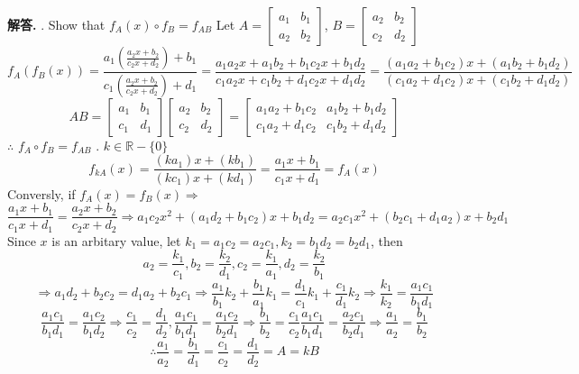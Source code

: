 \documentclass[12pt, a4paper, oneside]{article}
\newenvironment{solution}{\par\noindent\textbf{解答. }}{\par}
\begin{document}
\begin{CJK}{UTF8}{gbsn}
\begin{solution} . Show that $f_A(x) \circ f_B = f_{AB} $ \newline
  Let $A=\begin{bmatrix} a_1 & b_1 \\ a_2 & b_2 \end{bmatrix}$, $B=\begin{bmatrix}
    a_2 & b_2 \\ c_2 & d_2
  \end{bmatrix}$
  $$f_A(f_B(x)) = \frac{a_1\left(\frac{a_2x+b_2}{c_2x+d_2}\right)+b_1}{c_1\left(\frac{a_2x+b_2}{c_2x+d_2}\right)+d_1} = \frac{a_1a_2x+a_1b_2+b_1c_2x+b_1d_2}{c_1a_2x+c_1b_2+d_1c_2x+d_1d_2} =\frac{(a_1a_2+b_1c_2)x+(a_1b_2+b_1d_2)}{(c_1a_2+d_1c_2)x +(c_1b_2+d_1d_2)}$$
  $$AB = \begin{bmatrix}
    a_1 & b_1 \\ 
    c_1 & d_1
  \end{bmatrix} \begin{bmatrix}
    a_2 & b_2 \\ 
    c_2 & d_2
  \end{bmatrix} = \begin{bmatrix}
    a_1a_2+b_1c_2 & a_1b_2+b_1d_2 \\
    c_1a_2 +d_1c_2 & c_1b_2+d_1d_2
  \end{bmatrix}$$
  $\therefore$ $f_A\circ f_B = f_{AB}$ . $k\in \mathbb{R} - \{0\}$
 $$ f_{kA}(x) = \frac{(ka_1)x + (kb_1)}{(kc_1)x + (kd_1)} = \frac{a_1x+b_1}{c_1x+d_1}=f_A(x)$$
 Conversly, if $f_A(x) = f_B(x) \Rightarrow$
 $$ 
 \frac{a_1x+b_1}{c_1x+d_1} = \frac{a_2x+b_2}{c_2x+d_2} \Rightarrow a_1c_2x^2 + (a_1d_2 + b_1c_2)x + b_1d_2 = a_2c_1x^2 + (b_2c_1 + d_1a_2)x + b_2d_1
 $$
 Since $x$ is an arbitary value, let $k_1 = a_1c_2 = a_2c_1, k_2=b_1d_2=b_2d_1$, then
 $$ a_2 = \frac{k_1}{c_1}, b_2 = \frac{k_2}{d_1}, c_2=\frac{k_1}{a_1}, d_2 = \frac{k_2}{b_1}$$
 $$ \Rightarrow a_1d_2+b_2c_2 = d_1a_2 + b_2c_1 \Rightarrow \frac{a_1}{b_1}k_2 + \frac{b_1}{a_1}k_1 = \frac{d_1}{c_1}k_1  + \frac{c_1}{d_1}k_2\Rightarrow \frac{k_1}{k_2} = \frac{a_1c_1}{b_1d_1}$$
 $$  \frac{a_1c_1}{b_1d_1} = \frac{a_1c_2}{b_1d_2} \Rightarrow \frac{c_1}{c_2} = \frac{d_1}{d_2}, \frac{a_1c_1}{b_1d_1} = \frac{a_1c_2}{b_2d_1}\Rightarrow \frac{b_1}{b_2} = \frac{c_1}{c_2} \frac{a_1c_1}{b_1d_1} = \frac{a_2c_1}{b_2d_1}\Rightarrow \frac{a_1}{a_2} = \frac{b_1}{b_2}$$
 $$ \therefore \frac{a_1}{a_2} = \frac{b_1}{d_1} = \frac{c_1}{c_2} = \frac{d_1}{d_2} = A = kB $$ 

\end{solution}
\end{CJK}
\end{document}
